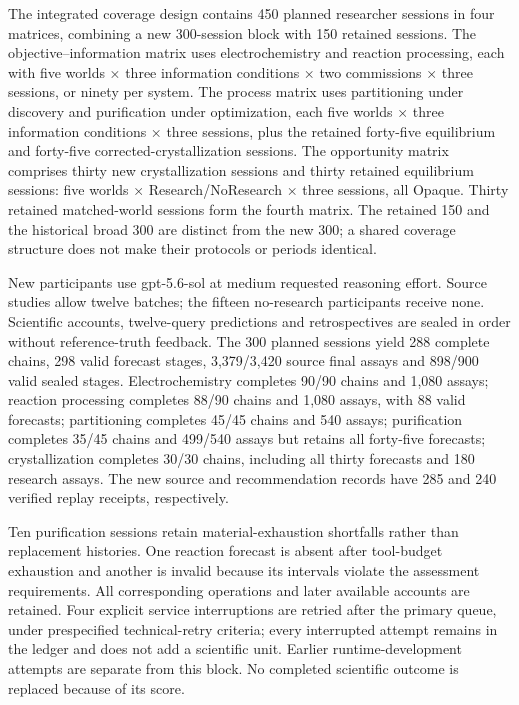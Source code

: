\documentclass[10pt,a4paper]{article}
\begin{document}
The integrated coverage design contains 450 planned researcher sessions in four matrices, combining a new 300-session block with 150 retained sessions. The objective--information matrix uses electrochemistry and reaction processing, each with five worlds × three information conditions × two commissions × three sessions, or ninety per system. The process matrix uses partitioning under discovery and purification under optimization, each five worlds × three information conditions × three sessions, plus the retained forty-five equilibrium and forty-five corrected-crystallization sessions. The opportunity matrix comprises thirty new crystallization sessions and thirty retained equilibrium sessions: five worlds × Research/NoResearch × three sessions, all Opaque. Thirty retained matched-world sessions form the fourth matrix. The retained 150 and the historical broad 300 are distinct from the new 300; a shared coverage structure does not make their protocols or periods identical.

New participants use gpt-5.6-sol at medium requested reasoning effort. Source studies allow twelve batches; the fifteen no-research participants receive none. Scientific accounts, twelve-query predictions and retrospectives are sealed in order without reference-truth feedback. The 300 planned sessions yield 288 complete chains, 298 valid forecast stages, 3,379/3,420 source final assays and 898/900 valid sealed stages. Electrochemistry completes 90/90 chains and 1,080 assays; reaction processing completes 88/90 chains and 1,080 assays, with 88 valid forecasts; partitioning completes 45/45 chains and 540 assays; purification completes 35/45 chains and 499/540 assays but retains all forty-five forecasts; crystallization completes 30/30 chains, including all thirty forecasts and 180 research assays. The new source and recommendation records have 285 and 240 verified replay receipts, respectively.

Ten purification sessions retain material-exhaustion shortfalls rather than replacement histories. One reaction forecast is absent after tool-budget exhaustion and another is invalid because its intervals violate the assessment requirements. All corresponding operations and later available accounts are retained. Four explicit service interruptions are retried after the primary queue, under prespecified technical-retry criteria; every interrupted attempt remains in the ledger and does not add a scientific unit. Earlier runtime-development attempts are separate from this block. No completed scientific outcome is replaced because of its score.
\end{document}
